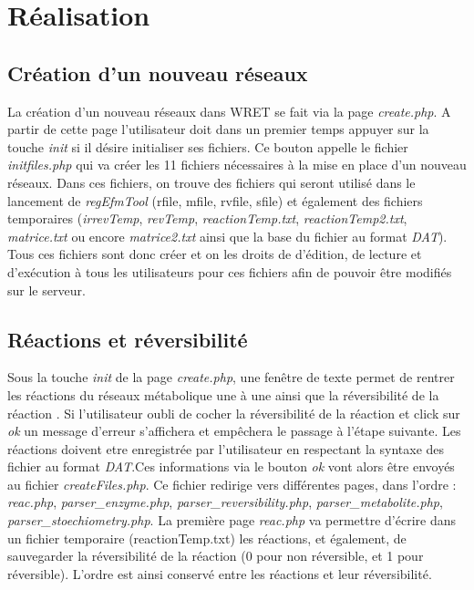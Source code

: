 \chapter{Réalisation}

\section{Création  d'un nouveau réseaux}
La création d'un nouveau réseaux dans WRET se fait via la page \emph{create.php}.
A partir de cette page l'utilisateur doit dans un premier temps appuyer sur la touche \emph{init} si il désire initialiser ses fichiers. Ce bouton appelle le fichier \emph{initfiles.php} qui va créer les 11 fichiers nécessaires à la mise en place d'un nouveau réseaux.
Dans ces fichiers, on trouve des fichiers qui seront utilisé dans le lancement de \emph{regEfmTool} (rfile, mfile, rvfile, sfile) et également des fichiers temporaires (\emph{irrevTemp}, \emph{revTemp}, \emph{reactionTemp.txt}, \emph{reactionTemp2.txt}, \emph{matrice.txt} ou encore \emph{matrice2.txt} ainsi que la base du fichier au format \emph{DAT}).
Tous ces fichiers sont donc créer et on les droits de d'édition, de lecture et d'exécution à tous les utilisateurs pour ces fichiers afin de pouvoir être modifiés sur le serveur.

\section{Réactions et réversibilité}
Sous la touche \emph{init} de la page \emph{create.php}, une fenêtre de texte permet de rentrer les réactions du réseaux métabolique une à une ainsi que la réversibilité de la réaction . Si l'utilisateur oubli de cocher la réversibilité de la réaction et click sur \emph{ok} un message d'erreur s'affichera et empêchera le passage à l'étape suivante. Les réactions doivent etre enregistrée par l'utilisateur en respectant la syntaxe des fichier au format \emph{DAT}.Ces informations via le bouton \emph{ok} vont alors être envoyés au fichier \emph{createFiles.php}.
Ce fichier redirige vers différentes pages, dans l'ordre : \emph{reac.php}, \emph{parser\_enzyme.php}, \emph{parser\_reversibility.php}, \emph{parser\_metabolite.php}, \emph{parser\_stoechiometry.php}.
La première page \emph{reac.php} va permettre d'écrire dans un fichier temporaire (reactionTemp.txt) les réactions, et également, de sauvegarder la réversibilité de la réaction (0 pour non réversible, et 1 pour réversible).
L'ordre est ainsi conservé entre les réactions et leur réversibilité.

